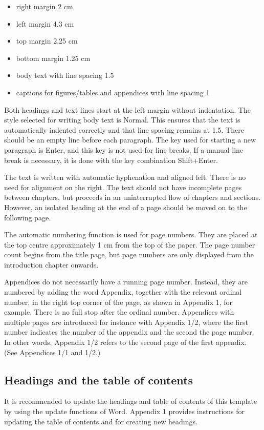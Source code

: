 \documentclass[12pt]{article}
\begin{document}
\begin{itemize}
	\item{right margin 2 cm}
	\item{left margin 4.3 cm}
	\item{top margin 2.25 cm}
	\item{bottom margin 1.25 cm}
	\item{body text with line spacing 1.5}
	\item{captions for figures/tables and appendices with line spacing 1}
\end{itemize}

Both headings and text lines start at the left margin without indentation. The style selected for writing body text is Normal. This ensures that the text is automatically indented correctly and that line spacing remains at 1.5. There should be an empty line before each paragraph. The key used for starting a new paragraph is Enter, and this key is not used for line breaks. If a manual line break is necessary, it is done with the key combination Shift+Enter.

The text is written with automatic hyphenation and aligned left. There is no need for alignment on the right. The text should not have incomplete pages between chapters, but proceeds in an uninterrupted flow of chapters and sections. However, an isolated heading at the end of a page should be moved on to the following page.

The automatic numbering function is used for page numbers. They are placed at the top centre approximately 1 cm from the top of the paper. The page number count begins from the title page, but page numbers are only displayed from the introduction chapter onwards.

Appendices do not necessarily have a running page number. Instead, they are numbered by adding the word Appendix, together with the relevant ordinal number, in the right top corner of the page, as shown in Appendix 1, for example. There is no full stop after the ordinal number. Appendices with multiple pages are introduced for instance with Appendix 1/2, where the first number indicates the number of the appendix and the second the page number. In other words, Appendix 1/2 refers to the second page of the first appendix. (See Appendices 1/1 and 1/2.)

\subsection{Headings and the table of contents}
It is recommended to update the headings and table of contents of this template by using the update functions of Word. Appendix 1 provides instructions for updating the table of contents and for creating new headings.
\end{document}

